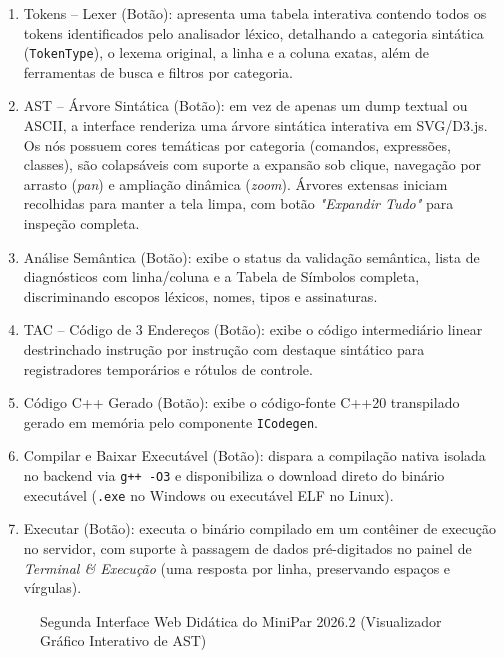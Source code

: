 \begin{enumerate}
    \item Tokens -- Lexer (Botão): apresenta uma tabela interativa contendo todos os tokens identificados pelo analisador léxico, detalhando a categoria sintática (\texttt{TokenType}), o lexema original, a linha e a coluna exatas, além de ferramentas de busca e filtros por categoria.
    \item AST -- Árvore Sintática (Botão): em vez de apenas um dump textual ou ASCII, a interface renderiza uma árvore sintática interativa em SVG/D3.js. Os nós possuem cores temáticas por categoria (comandos, expressões, classes), são colapsáveis com suporte a expansão sob clique, navegação por arrasto (\textit{pan}) e ampliação dinâmica (\textit{zoom}). Árvores extensas iniciam recolhidas para manter a tela limpa, com botão \textit{"Expandir Tudo"} para inspeção completa.
    \item Análise Semântica (Botão): exibe o status da validação semântica, lista de diagnósticos com linha/coluna e a Tabela de Símbolos completa, discriminando escopos léxicos, nomes, tipos e assinaturas.
    \item TAC -- Código de 3 Endereços (Botão): exibe o código intermediário linear destrinchado instrução por instrução com destaque sintático para registradores temporários e rótulos de controle.
    \item Código C++ Gerado (Botão): exibe o código-fonte C++20 transpilado gerado em memória pelo componente \texttt{ICodegen}.
    \item Compilar e Baixar Executável (Botão): dispara a compilação nativa isolada no backend via \texttt{g++ -O3} e disponibiliza o download direto do binário executável (\texttt{.exe} no Windows ou executável ELF no Linux).
    \item Executar (Botão): executa o binário compilado em um contêiner de execução no servidor, com suporte à passagem de dados pré-digitados no painel de \textit{Terminal \& Execução} (uma resposta por linha, preservando espaços e vírgulas).
\end{enumerate}

\begin{figure}[htbp]
    \centering
    \caption{Segunda Interface Web Didática do MiniPar 2026.2 (Visualizador Gráfico Interativo de AST)}
    \label{fig:ide_didatica_ast}
\end{figure}
